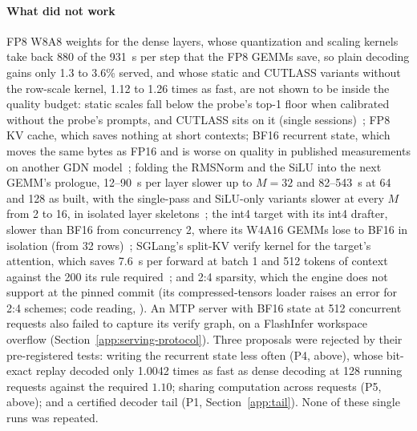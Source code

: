 \paragraph{What did not work}\label{sec:stack-failed} FP8 W8A8 weights for the dense layers, whose quantization and scaling kernels take back 880 of the 931~\textmu s per step that the FP8 GEMMs save, so plain decoding gains only 1.3 to 3.6\% served, and whose static and CUTLASS variants without the row-scale kernel, 1.12 to 1.26 times as fast, are not shown to be inside the quality budget: static scales fall below the probe's top-1 floor when calibrated without the probe's prompts, and CUTLASS sits on it (single sessions)~; FP8 KV cache, which saves nothing at short contexts; BF16 recurrent state, which moves the same bytes as FP16 and is worse on quality in published measurements on another GDN model~\cite{damp}; folding the RMSNorm and the SiLU into the next GEMM's prologue, 12--90~\textmu s per layer slower up to $M=32$ and 82--543~\textmu s at 64 and 128 as built, with the single-pass and SiLU-only variants slower at every $M$ from 2 to 16, in isolated layer skeletons~; the int4 target with its int4 drafter, slower than BF16 from concurrency 2, where its W4A16 GEMMs lose to BF16 in isolation (from 32 rows)~; SGLang's split-KV verify kernel for the target's attention, which saves 7.6~\textmu s per forward at batch 1 and 512 tokens of context against the 200 its rule required~; and 2:4 sparsity, which the engine does not support at the pinned commit (its compressed-tensors loader raises an error for 2:4 schemes; code reading, ). An MTP server with BF16 state at 512 concurrent requests also failed to capture its verify graph, on a FlashInfer workspace overflow (Section~\ref{app:serving-protocol}). Three proposals were rejected by their pre-registered tests: writing the recurrent state less often (P4, above), whose bit-exact replay decoded only 1.0042 times as fast as dense decoding at 128 running requests against the required $1.10$; sharing computation across requests (P5, above); and a certified decoder tail (P1, Section~\ref{app:tail}). None of these single runs was repeated.

